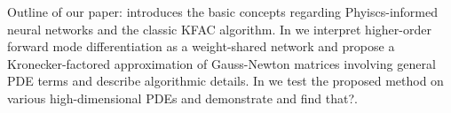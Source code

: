 Outline of our paper:  introduces the basic concepts regarding Phyiscs-informed neural networks and the classic KFAC algorithm.
In  we interpret higher-order forward mode differentiation as a weight-shared network and propose a Kronecker-factored approximation of Gauss-Newton matrices involving general PDE terms and describe algorithmic details.
In  we test the proposed method on various high-dimensional PDEs and demonstrate and find that?.


\begin{comment}
    For the important example of the Laplace operator the corresponding Gauss-Newton matrix %
    takes the form
    \begin{equation*}
        \mG_{ij}
        =
        \int_\Omega \Delta \partial_{\theta_i} u_\theta \Delta \partial_{\theta_j} u_\theta \, \mathrm dx,
    \end{equation*}
    where $u_\theta$ denotes the neural network ansatz and $\Omega\subset\mathbb R^d$ is the computational domain. Following the KFAC literature \cite{martens2015optimizing}, $G$ is approximated by a matrix of the form $\operatorname{diag}(\mA_1\otimes\mB_1, \dots, \mA_L\otimes\mB_L)$ which, due to the comparatively small size of the factors $\mA_i$ and $\mB_i$ and the identity $(\mA \otimes \mB)^{-1} = \mA^{-1} \otimes \mB^{-1}$, is \emph{much} faster to invert than $\mG$. Note that differential operators like the Laplacian complicate the computational graph considerably, which precludes the direct application of the existing KFAC approximations.
\end{comment}


